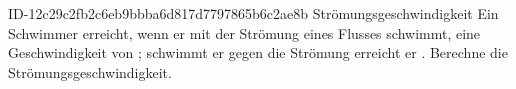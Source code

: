 \begin{exercise}
      {ID-12c29c2fb2c6eb9bbba6d817d7797865b6c2ae8b}
      {Strömungsgeschwindigkeit}
  \ifproblem\problem
    Ein Schwimmer erreicht, wenn er mit der Strömung eines Flusses schwimmt,
    eine Geschwindigkeit von ; schwimmt er gegen die Strömung erreicht
    er . Berechne die Strömungsgeschwindigkeit.
  \fi
\end{exercise}
